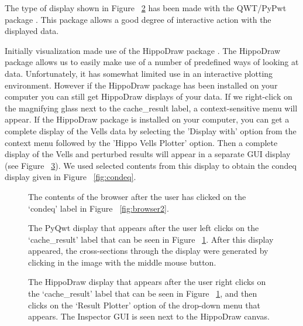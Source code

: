 \documentclass[10pt]{article}
\begin{document}
The type of display shown in Figure  ~\ref{fig:vells_0} 
has been made with the QWT/PyPwt package  \cite{rathmann}.
This package allows a good degree of interactive action with the
displayed data.

Initially visualization made use of the HippoDraw package \cite{kunz}.
The HippoDraw package allows us to easily make use of a number
of predefined ways of looking at data. Unfortunately, it has
somewhat limited use in an interactive plotting environment. However
if the HippoDraw package has been installed on your computer
you can still get HippoDraw displays of your data.
If we right-click on the magnifying glass next to
the cache\_result label, a context-sensitive menu will appear.
If the HippoDraw package is installed on your computer, you can get
a complete display of the Vells data by 
selecting the 'Display with' option from the context menu followed by the
'Hippo Vells Plotter' option. Then a complete display of 
the Vells and perturbed results will appear in a separate GUI
display (see Figure ~\ref{fig:browser4}). We used selected contents
from this display to obtain the condeq display given in 
Figure  ~\ref{fig:condeq}.

\begin{figure}
{\par\centering
{}
\par}
\caption {The contents of the browser after the user has clicked on the
`condeq' label in Figure ~\ref{fig:browser2}. }
\label{fig:browser3}
\end{figure}

\begin{figure}
{\par\centering
{}
\par}
\caption {The PyQwt display that appears after the user
left clicks on the `cache\_result' label that can be seen in
Figure ~\ref{fig:browser3}. After this display appeared, the
cross-sections through the display were generated by clicking
in the image with the middle mouse button.}
\label{fig:vells_0}
\end{figure}

\begin{figure}
{\par\centering
{}
\par}
\caption {The HippoDraw display that appears after the user
right clicks on the `cache\_result' label that can be seen in
Figure ~\ref{fig:browser3}, and then clicks on the `Result Plotter' option
of the drop-down menu that appears. The Inspector GUI is seen next to
the HippoDraw canvas.}
\label{fig:browser4}
\end{figure}
\end{document}
